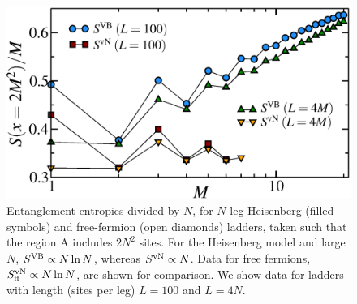 \begin{figure} { \includegraphics[width=6in]{./figures/paper1/figure4/4fig.eps}
 \caption[Area Law in 2D Heis model]{
 {\color{red} Entanglement entropies divided by $N$,  for $N$-leg Heisenberg
(filled symbols) and free-fermion (open diamonds) ladders, taken such that
the region A includes $2N^2$ sites.  
For the Heisenberg model and large $N$, $S^{\rm VB}\propto N \ln N$,
whereas $S^{\rm vN}\propto N$.  
Data for free fermions, $S^{\rm vN}_{\rm ff}\propto N \ln N$,  are shown for comparison.
We show data for ladders with length (sites per leg) $L =100$ and
$L=4N$.  
}
\label{zigzag}}} 
\end{figure}
